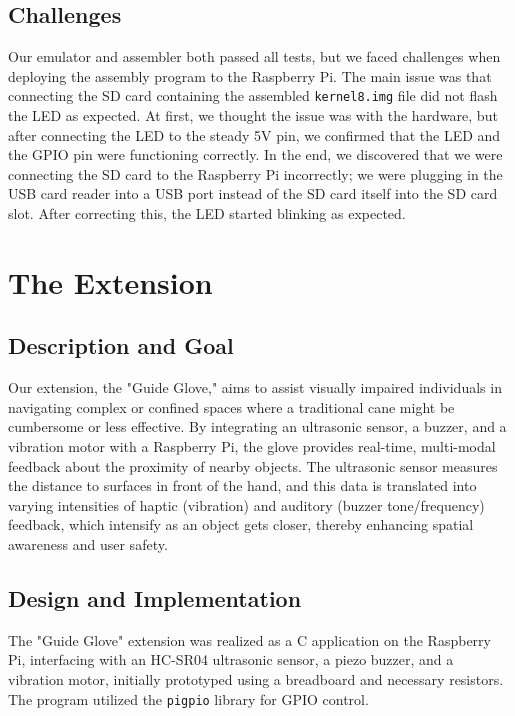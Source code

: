 \documentclass[11pt]{article}
\begin{document}
\subsection{Challenges}
Our emulator and assembler both passed all tests, but we faced challenges when deploying the assembly program to the Raspberry Pi.
The main issue was that connecting the SD card containing the assembled 
\texttt{kernel8.img} file did not flash the LED as expected.
At first, we thought the issue was with the hardware, but after connecting the LED to the steady 5V pin, 
we confirmed that the LED and the GPIO pin were functioning correctly.
In the end, we discovered that we were connecting the SD card to the Raspberry Pi incorrectly;
we were plugging in the USB card reader into a USB port instead of the SD card itself into the SD card slot.
After correcting this, the LED started blinking as expected.

\section{The Extension}

\subsection{Description and Goal}
Our extension, the "Guide Glove," aims to assist visually impaired individuals in navigating complex or confined spaces where a traditional cane might be cumbersome or less effective. By integrating an ultrasonic sensor, a buzzer, and a vibration motor with a Raspberry Pi, the glove provides real-time, multi-modal feedback about the proximity of nearby objects. The ultrasonic sensor measures the distance to surfaces in front of the hand, and this data is translated into varying intensities of haptic (vibration) and auditory (buzzer tone/frequency) feedback, which intensify as an object gets closer, thereby enhancing spatial awareness and user safety.

\subsection{Design and Implementation}
The "Guide Glove" extension was realized as a C application on the Raspberry Pi, interfacing with an HC-SR04 ultrasonic sensor, a piezo buzzer, and a vibration motor, initially prototyped using a breadboard and necessary resistors. The program utilized the \texttt{pigpio} library for GPIO control.
\end{document}
